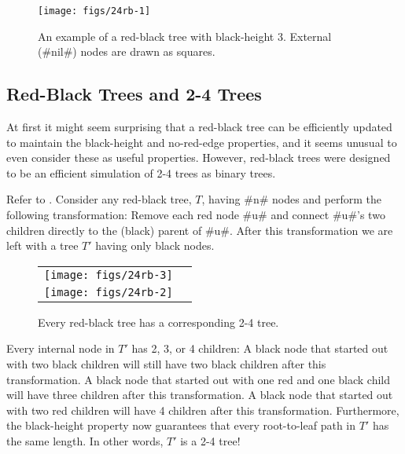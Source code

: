 \begin{figure}
  \begin{center}
    \texttt{[image: figs/24rb-1]}
  \end{center}
  \caption{An example of a red-black tree with black-height 3.  External (#nil#) nodes are drawn as squares.} 
\end{figure}


\subsection{Red-Black Trees and 2-4 Trees}

At first it might seem surprising that a red-black tree can be efficiently
updated to maintain the black-height and no-red-edge properties, and
it seems unusual to even consider these as useful properties.  However,
red-black trees were designed to be an efficient simulation of 2-4 trees
as binary trees.

Refer to .
Consider any red-black tree, $T$, having #n# nodes and perform the
following transformation: Remove each red node #u# and connect #u#'s two
children directly to the (black) parent of #u#.  After this transformation
we are left with a tree $T'$ having only black nodes.
\begin{figure}
  \begin{center}
    \begin{tabular}{cc}
      \texttt{[image: figs/24rb-3]} \\
      \texttt{[image: figs/24rb-2]}
    \end{tabular}
  \end{center}
  \caption{Every red-black tree has a corresponding 2-4 tree.}
\end{figure}

Every internal node in $T'$ has 2, 3, or 4 children: A black node that
started out with two black children will still have two black children
after this transformation.  A black node that started out with one red
and one black child will have three children after this transformation.
A black node that started out with two red children will have 4 children
after this transformation.  Furthermore, the black-height property now
guarantees that every root-to-leaf path in $T'$ has the same length.
In other words, $T'$ is a 2-4 tree!

